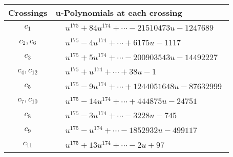 \documentclass[1p]{elsarticle_modified}
\theoremstyle{definition}
\begin{document}
\begin{tabular}{m{50pt}|m{274pt}}
Crossings & \hspace{64pt}u-Polynomials at each crossing \\
\hline $$\begin{aligned}c_{1}\end{aligned}$$&$\begin{aligned}
&u^{175}+84 u^{174}+\cdots-21510473 u-1247689
\end{aligned}$\\
\hline $$\begin{aligned}c_{2},c_{6}\end{aligned}$$&$\begin{aligned}
&u^{175}-4 u^{174}+\cdots+6175 u-1117
\end{aligned}$\\
\hline $$\begin{aligned}c_{3}\end{aligned}$$&$\begin{aligned}
&u^{175}+5 u^{174}+\cdots-200903543 u-14492227
\end{aligned}$\\
\hline $$\begin{aligned}c_{4},c_{12}\end{aligned}$$&$\begin{aligned}
&u^{175}+u^{174}+\cdots+38 u-1
\end{aligned}$\\
\hline $$\begin{aligned}c_{5}\end{aligned}$$&$\begin{aligned}
&u^{175}-9 u^{174}+\cdots+1244051648 u-87632999
\end{aligned}$\\
\hline $$\begin{aligned}c_{7},c_{10}\end{aligned}$$&$\begin{aligned}
&u^{175}-14 u^{174}+\cdots+444875 u-24751
\end{aligned}$\\
\hline $$\begin{aligned}c_{8}\end{aligned}$$&$\begin{aligned}
&u^{175}-3 u^{174}+\cdots-3228 u-745
\end{aligned}$\\
\hline $$\begin{aligned}c_{9}\end{aligned}$$&$\begin{aligned}
&u^{175}- u^{174}+\cdots-1852932 u-499117
\end{aligned}$\\
\hline $$\begin{aligned}c_{11}\end{aligned}$$&$\begin{aligned}
&u^{175}+13 u^{174}+\cdots-2 u+97
\end{aligned}$\\
\hline
\end{tabular}\\~\\
\end{document}
